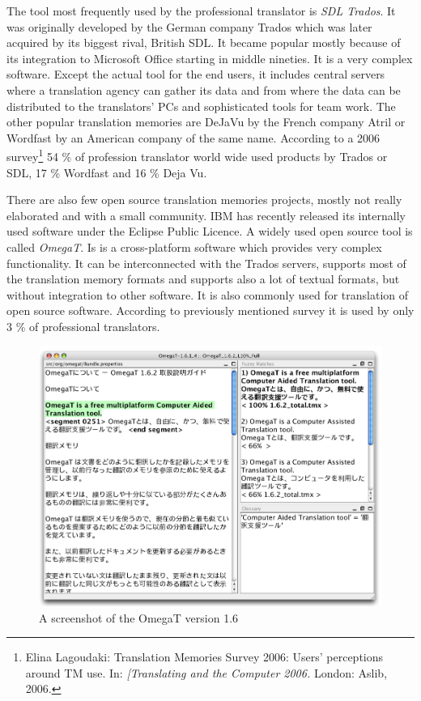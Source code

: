 The tool most frequently used by the professional translator is \emph{SDL Trados}. It was originally developed by the German company Trados which was later acquired by its biggest rival, British SDL. It became popular mostly because of its integration to Microsoft Office starting in middle nineties. It is a very complex software. Except the actual tool for the end users, it includes central servers where a translation agency can gather its data and from where the data can be distributed to the translators' PCs and sophisticated tools for team work. The other popular translation memories are DeJaVu by the French company Atril or Wordfast by an American company of the same name. According to a 2006 survey\footnote{Elina Lagoudaki: Translation Memories Survey 2006: 
Users' perceptions around TM use. In: \emph{[Translating and the Computer 2006.} London: Aslib, 2006.} 54 \% of profession translator world wide used products by Trados or SDL, 17 \% Wordfast and 16 \% Deja Vu.

There are also few open source translation memories projects, mostly not really elaborated and with a small community. IBM has recently released its internally used software under the Eclipse Public Licence. A widely used open source tool is called \emph{OmegaT}. Is is a cross-platform software which provides very complex functionality. It can be interconnected with the Trados servers, supports most of the translation memory formats and supports also a lot of textual formats, but without integration to other software. It is also commonly used for translation of open source software. According to previously mentioned survey it is used by only 3 \% of professional translators.

\begin{figure}
\begin{center}
\includegraphics[scale=.4]{./figures/omegat.png}
\end{center}

\caption{A screenshot of the OmegaT version 1.6}

\end{figure}

